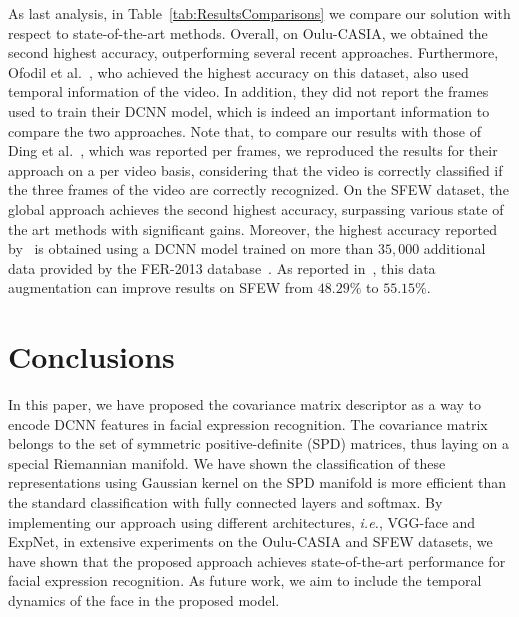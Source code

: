 \documentclass{bmvc2k}
\begin{document}
As last analysis, in Table~\ref{tab:ResultsComparisons} we compare our solution with respect to state-of-the-art methods.
Overall, on Oulu-CASIA, we obtained the second highest accuracy, outperforming several recent approaches. Furthermore, Ofodil et al.~\cite{ofodile2017automatic}, who achieved the highest accuracy on this dataset, also used temporal information of the video. In addition, they did not report the frames used to train their DCNN model, which is indeed an important information to compare the two approaches. Note that, to compare our results with those of Ding et al.~\cite{ding2017facenet2expnet}, which was reported per frames, we reproduced the results for their approach on a per video basis, considering that the video is correctly classified if the three frames of the video are correctly recognized.
On the SFEW dataset, the global approach achieves the second highest accuracy, surpassing various state of the art methods with significant gains. Moreover, the highest accuracy reported by~\cite{yu2015image} is obtained using a DCNN model trained on more than $35,000$ additional data provided by the FER-2013 database~\cite{goodfellow2013challenges}. As reported in~\cite{ding2017facenet2expnet}, this data augmentation can improve results on SFEW from $48.29\%$ to $55.15\%$. 
\section{Conclusions}\label{sect:conclusion}
In this paper, we have proposed the covariance matrix descriptor as a way to encode DCNN features in facial expression recognition. 
The covariance matrix belongs to the set of symmetric positive-definite (SPD) matrices, thus laying on a special Riemannian manifold. We have shown the classification of these representations using Gaussian kernel on the SPD manifold is more efficient than the standard classification with fully connected layers and softmax. By implementing our approach using different architectures, \emph{i.e.}, VGG-face and ExpNet, in extensive experiments on the Oulu-CASIA and SFEW datasets, we have shown that the proposed approach achieves state-of-the-art performance for facial expression recognition. As future work, we aim to include the temporal dynamics of the face in the proposed model. 






\newpage
\end{document}
